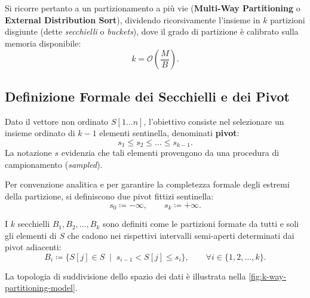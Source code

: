 Si ricorre pertanto a un partizionamento a più vie (\textbf{Multi-Way Partitioning} o \textbf{External Distribution Sort}), dividendo ricorsivamente l'insieme in $k$ partizioni disgiunte (dette \textit{secchielli} o \textit{buckets}), dove il grado di partizione è calibrato sulla memoria disponibile:
\begin{equation}
  k = \mathcal{O}\left(\frac{M}{B}\right).
\end{equation}

\subsection{Definizione Formale dei Secchielli e dei Pivot}
Dato il vettore non ordinato $S[1 \dots n]$, l'obiettivo consiste nel selezionare un insieme ordinato di $k - 1$ elementi sentinella, denominati \textbf{pivot}:
\begin{equation}
  s_1 \le s_2 \le \dots \le s_{k-1}.
\end{equation}
La notazione $s$ evidenzia che tali elementi provengono da una procedura di campionamento (\textit{sampled}).

Per convenzione analitica e per garantire la completezza formale degli estremi della partizione, si definiscono due pivot fittizi sentinella:
\begin{equation}
  s_0 \coloneqq -\infty, \qquad s_k \coloneqq +\infty.
\end{equation}

\begin{definition}
I $k$ secchielli $B_1, B_2, \dots, B_k$ sono definiti come le partizioni formate da tutti e soli gli elementi di $S$ che cadono nei rispettivi intervalli semi-aperti determinati dai pivot adiacenti:
\begin{equation}
  B_i \coloneqq \Big\{ S[j] \in S \;\mid\; s_{i-1} < S[j] \le s_i \Big\}, \qquad \forall i \in \{1, 2, \dots, k\}.
  \label{eq:bucket-formal-def}
\end{equation}
\end{definition}

La topologia di suddivisione dello spazio dei dati è illustrata nella \autoref{fig:k-way-partitioning-model}.

